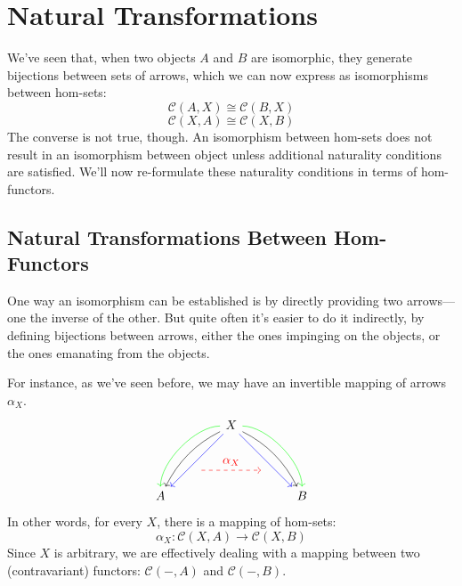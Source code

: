 \documentclass[DaoFP]{subfiles}
\begin{document}
\setcounter{chapter}{8}

\chapter{Natural Transformations}

We've seen that, when two objects $A$ and $B$ are isomorphic, they generate bijections between sets of arrows, which we can now express as isomorphisms between hom-sets:
\[\mathcal{C}(A, X) \cong \mathcal{C}(B, X)\]
\[\mathcal{C}(X, A) \cong \mathcal{C}(X, B)\]
The converse is not true, though. An isomorphism between hom-sets does not result in an isomorphism between object unless additional naturality conditions are satisfied. We'll now re-formulate these naturality conditions in terms of hom-functors.

\section{Natural Transformations Between Hom-Functors}

One way an isomorphism can be established is by directly providing two arrows---one the inverse of the other. But quite often it's easier to do it indirectly, by defining bijections between arrows, either the ones impinging on the objects, or the ones emanating from the objects. 

For instance, as we've seen before, we may have an invertible mapping of arrows $\alpha_X$.
\[
 \begin{tikzcd}
 \node(x) at (0, 2) {X};
 \node(a) at (-2, 0) {A};
 \node(b) at (2, 0) {B};
 \node(c1) at (-1, 1.5) {};
 \node(c2) at (-1.5, 1) {};
 \node(c3) at (-1, 2) {};
 \node(c4) at (-2, 1) {};
 \node(d1) at (1, 1.5) {};
 \node(d2) at (1.5, 1) {};
 \node(d3) at (1, 2) {};
 \node(d4) at (2, 1) {};
\node (aa) at (-1, 0.75) {};
 \node (bb) at (1, 0.75) {};
 \draw[->] (x) .. controls (c1)  and (c2) .. (a); %
 \draw[->, green] (x) .. controls (c3)  and (c4) .. (a); %
 \draw[->, blue] (x) -- (a); 
  \draw[->] (x) .. controls (d1)  and (d2) .. (b); %
 \draw[->, green] (x) .. controls (d3)  and (d4) .. (b); %
 \draw[->, blue] (x) -- (b); 
 \draw[->, red, dashed] (aa) -- node[above]{\alpha_X} (bb);
 \end{tikzcd}
\]
In other words, for every $X$, there is a mapping of hom-sets:
\[ \alpha_X \colon \mathcal{C}(X, A) \to \mathcal{C}(X, B) \]
Since $X$ is arbitrary, we are effectively dealing with a mapping between two (contravariant) functors:  $\mathcal{C}(-, A)$ and $\mathcal{C}(-, B)$. 
\end{document}

